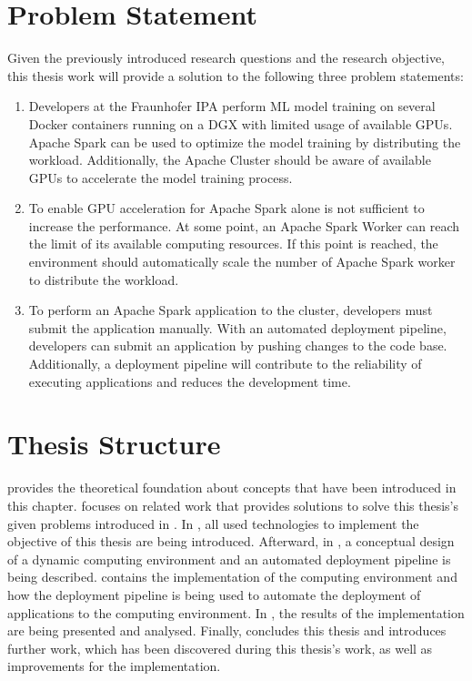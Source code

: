 \section{Problem Statement}
\label{sec:01_introduction_problem}
Given the previously introduced research questions and the research objective, this thesis work will provide a solution to the following three problem statements:

\begin{enumerate}
\item Developers at the Fraunhofer IPA perform ML model training on several Docker containers running on a DGX with limited usage of available GPUs.
Apache Spark can be used to optimize the model training by distributing the workload.
Additionally, the Apache Cluster should be aware of available GPUs to accelerate the model training process.

\item To enable GPU acceleration for Apache Spark alone is not sufficient to increase the performance.
At some point, an Apache Spark Worker can reach the limit of its available computing resources.
If this point is reached, the environment should automatically scale the number of Apache Spark worker to distribute the workload.

\item To perform an Apache Spark application to the cluster, developers must submit the application manually.
With an automated deployment pipeline, developers can submit an application by pushing changes to the code base.
Additionally, a deployment pipeline will contribute to the reliability of executing applications and reduces the development time.
\end{enumerate}


\section{Thesis Structure}
 provides the theoretical foundation about concepts that have been introduced in this chapter.
 focuses on related work that provides solutions to solve this thesis's given problems introduced in .
In , all used technologies to implement the objective of this thesis are being introduced.
Afterward, in , a conceptual design of a dynamic computing environment and an automated deployment pipeline is being described.
 contains the implementation of the computing environment and how the deployment pipeline is being used to automate the deployment of applications to the computing environment.
In , the results of the implementation are being presented and analysed.
Finally,  concludes this thesis and introduces further work, which has been discovered during this thesis's work, as well as improvements for the implementation.

